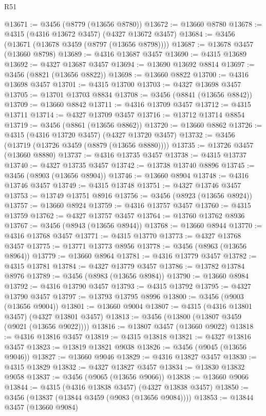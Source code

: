 \begin{lexlean}{R51}
\begin{coremodule}
@13671 := @3456 (@8779 (@13656 @8780))
@13672 := @13660 @8780
@13678 := @4315 (@4316 @13672 @3457) (@4327 @13672 @3457)
@13684 := @3456 (@13671 (@13678 @3459 (@8797 (@13656 @8798))))
@13687 := @13678 @3457 (@13660 @8798)
@13689 := @4316 @13687 @3457
@13690 := @4315 @13689
@13692 := @4327 @13687 @3457
@13694 := @13690 @13692 @8814
@13697 := @3456 (@8821 (@13656 @8822))
@13698 := @13660 @8822
@13700 := @4316 @13698 @3457
@13701 := @4315 @13700
@13703 := @4327 @13698 @3457
@13705 := @13701 @13703 @8834
@13708 := @3456 (@8841 (@13656 @8842))
@13709 := @13660 @8842
@13711 := @4316 @13709 @3457
@13712 := @4315 @13711
@13714 := @4327 @13709 @3457
@13716 := @13712 @13714 @8854
@13719 := @3456 (@8861 (@13656 @8862))
@13720 := @13660 @8862
@13726 := @4315 (@4316 @13720 @3457) (@4327 @13720 @3457)
@13732 := @3456 (@13719 (@13726 @3459 (@8879 (@13656 @8880))))
@13735 := @13726 @3457 (@13660 @8880)
@13737 := @4316 @13735 @3457
@13738 := @4315 @13737
@13740 := @4327 @13735 @3457
@13742 := @13738 @13740 @8896
@13745 := @3456 (@8903 (@13656 @8904))
@13746 := @13660 @8904
@13748 := @4316 @13746 @3457
@13749 := @4315 @13748
@13751 := @4327 @13746 @3457
@13753 := @13749 @13751 @8916
@13756 := @3456 (@8923 (@13656 @8924))
@13757 := @13660 @8924
@13759 := @4316 @13757 @3457
@13760 := @4315 @13759
@13762 := @4327 @13757 @3457
@13764 := @13760 @13762 @8936
@13767 := @3456 (@8943 (@13656 @8944))
@13768 := @13660 @8944
@13770 := @4316 @13768 @3457
@13771 := @4315 @13770
@13773 := @4327 @13768 @3457
@13775 := @13771 @13773 @8956
@13778 := @3456 (@8963 (@13656 @8964))
@13779 := @13660 @8964
@13781 := @4316 @13779 @3457
@13782 := @4315 @13781
@13784 := @4327 @13779 @3457
@13786 := @13782 @13784 @8976
@13789 := @3456 (@8983 (@13656 @8984))
@13790 := @13660 @8984
@13792 := @4316 @13790 @3457
@13793 := @4315 @13792
@13795 := @4327 @13790 @3457
@13797 := @13793 @13795 @8996
@13800 := @3456 (@9003 (@13656 @9004))
@13801 := @13660 @9004
@13807 := @4315 (@4316 @13801 @3457) (@4327 @13801 @3457)
@13813 := @3456 (@13800 (@13807 @3459 (@9021 (@13656 @9022))))
@13816 := @13807 @3457 (@13660 @9022)
@13818 := @4316 @13816 @3457
@13819 := @4315 @13818
@13821 := @4327 @13816 @3457
@13823 := @13819 @13821 @9038
@13826 := @3456 (@9045 (@13656 @9046))
@13827 := @13660 @9046
@13829 := @4316 @13827 @3457
@13830 := @4315 @13829
@13832 := @4327 @13827 @3457
@13834 := @13830 @13832 @9058
@13837 := @3456 (@9065 (@13656 @9066))
@13838 := @13660 @9066
@13844 := @4315 (@4316 @13838 @3457) (@4327 @13838 @3457)
@13850 := @3456 (@13837 (@13844 @3459 (@9083 (@13656 @9084))))
@13853 := @13844 @3457 (@13660 @9084)

\end{coremodule}
\end{lexlean}
